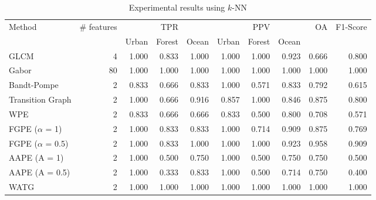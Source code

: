 \documentclass[journal]{IEEEtran}
\begin{document}
\begin{table}[hbt]
	\centering
	\caption{Experimental results using $k$-NN}
	\label{tab:result1}
	\begin{tabular}{l*9{r}}
		\toprule
		\multirow{2}{*}{Method}      & \multirow{2}{*}{\# features}         &       & TPR   &       &       & PPV    &       & \multirow{2}{*}{OA}  & \multirow{2}{*}{F1-Score} \\ \cmidrule(lr){3-5} \cmidrule(lr){6-8}
		&   & Urban & Forest & Ocean & Urban & Forest & Ocean & &  \\ \cmidrule(lr){1-1}
		\cmidrule(lr){2-2}
		\cmidrule(lr){3-5}
		\cmidrule(lr){6-8}
		\cmidrule(lr){9-9}
		\cmidrule(lr){10-10}
		GLCM            & 4   & 1.000 & 0.833  & 1.000 & 1.000 & 1.000  & 0.923 & 0.666 & 0.800\\
		Gabor           & 80  & 1.000 & 1.000  & 1.000 & 1.000 & 1.000  & 1.000 & 1.000 & 1.000\\ %
		\cmidrule(lr){1-1}
		\cmidrule(lr){2-2}
		\cmidrule(lr){3-5}
		\cmidrule(lr){6-8}
		\cmidrule(lr){9-9}
		\cmidrule(lr){10-10}
		Bandt-Pompe   & 2 & 0.833 &  0.666  & 0.833 & 1.000 & 0.571  & 0.833 & 0.792 &  0.615  \\ 
		Transition Graph & 2  & 1.000 & 0.666  & 0.916 & 0.857 & 1.000  & 0.846 & 0.875 & 0.800 \\ %
		\cmidrule(lr){1-1}
		\cmidrule(lr){2-2}
		\cmidrule(lr){3-5}
		\cmidrule(lr){6-8}
		\cmidrule(lr){9-9}
		\cmidrule(lr){10-10}
		WPE   & 2 & 0.833 &  0.666  & 0.666 & 0.833 & 0.500  & 0.800 & 0.708 &  0.571  \\ 
		FGPE ($\alpha$ = 1)  & 2 & 1.000 &  0.833  & 0.833 & 1.000 & 0.714  & 0.909 & 0.875 &  0.769  \\ 
		FGPE ($\alpha$ = 0.5)   & 2 & 1.000 &  0.833  & 1.000 & 1.000 & 1.000  & 0.923 & 0.958 &  0.909  \\ 
		AAPE (A = 1)   & 2 & 1.000 &  0.500  & 0.750  & 1.000 & 0.500  & 0.750  & 0.750 &  0.500  \\ 
		AAPE (A = 0.5)   & 2 & 1.000 &  0.333  & 0.833 & 1.000 & 0.500  & 0.714 & 0.750 &  0.400  \\ %
		\cmidrule(lr){1-1}
		\cmidrule(lr){2-2}
		\cmidrule(lr){3-5}
		\cmidrule(lr){6-8}
		\cmidrule(lr){9-9}
		\cmidrule(lr){10-10}
		WATG        & 2  & 1.000 & 1.000  & 1.000 & 1.000 & 1.000  & 1.000 & 1.000 & 1.000 \\ 
		\bottomrule
	\end{tabular}
\end{table}
\end{document}

